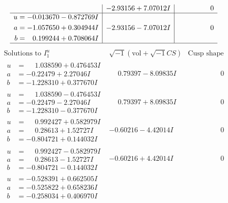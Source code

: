 \documentclass[1p]{elsarticle_modified}
\theoremstyle{definition}
\newcommand{\I}{\sqrt{-1}}
\begin{document}
$$\begin{array}{c|c|c}
 & -2.93156 + 7.07012 I & \phantom{-0.000000 } 0 \\ \hline\begin{aligned}
u &= -0.013670 - 0.872769 I \\
a &= -1.057650 + 0.304944 I \\
b &= \phantom{-}0.199244 + 0.708064 I\end{aligned}
 & -2.93156 - 7.07012 I & \phantom{-0.000000 } 0\\
 \hline 
 \end{array}$$\newpage$$\begin{array}{c|c|c}  
\text{Solutions to }I^u_{1}& \I (\text{vol} + \sqrt{-1}CS) & \text{Cusp shape}\\
 \hline 
\begin{aligned}
u &= \phantom{-}1.038590 + 0.476453 I \\
a &= -0.22479 + 2.27046 I \\
b &= -1.228310 + 0.377670 I\end{aligned}
 & \phantom{-}0.79397 - 8.09835 I & \phantom{-0.000000 } 0 \\ \hline\begin{aligned}
u &= \phantom{-}1.038590 - 0.476453 I \\
a &= -0.22479 - 2.27046 I \\
b &= -1.228310 - 0.377670 I\end{aligned}
 & \phantom{-}0.79397 + 8.09835 I & \phantom{-0.000000 } 0 \\ \hline\begin{aligned}
u &= \phantom{-}0.992427 + 0.582979 I \\
a &= \phantom{-}0.28613 + 1.52727 I \\
b &= -0.804721 + 0.144032 I\end{aligned}
 & -0.60216 - 4.42014 I & \phantom{-0.000000 } 0 \\ \hline\begin{aligned}
u &= \phantom{-}0.992427 - 0.582979 I \\
a &= \phantom{-}0.28613 - 1.52727 I \\
b &= -0.804721 - 0.144032 I\end{aligned}
 & -0.60216 + 4.42014 I & \phantom{-0.000000 } 0 \\ \hline\begin{aligned}
u &= -0.528391 + 0.662505 I \\
a &= -0.525822 + 0.658236 I \\
b &= -0.258034 + 0.406970 I\end{aligned}

\end{array}$$
\end{document}
